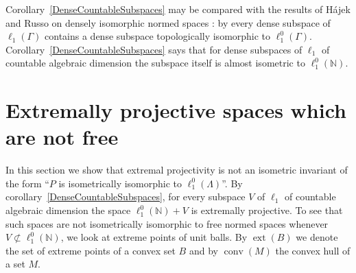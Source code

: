 \documentclass[12pt]{article}
\newcommand{\lo}[1]{\ell_1^0(#1)}
\newcommand{\ellone}[1]{\ell_1(#1)}
\newcommand{\ext}{\operatorname{ext}}
\newcommand{\conv}{\operatorname{conv}}
\begin{document}
Corollary~\ref{DenseCountableSubspaces} may be compared with the results of
H\'ajek and Russo on densely isomorphic normed spaces
\cite{HajekRussoDenselyIsom}: by \cite[theorem 2.4]{HajekRussoDenselyIsom}
every dense subspace of $\ellone{\Gamma}$ contains a dense subspace
topologically isomorphic to $\lo{\Gamma}$. Corollary~\ref{DenseCountableSubspaces}
says that for dense subspaces of $\ell_1$ of countable algebraic dimension
the subspace itself is almost isometric to $\lo{\mathbb{N}}$.


\section{Extremally projective spaces which are not free}\label{SectionCounterexample}

In this section we show that extremal projectivity is not an isometric
invariant of the form ``$P$ is isometrically isomorphic to $\lo{\Lambda}$''.
By corollary~\ref{DenseCountableSubspaces}, for every subspace $V$ of $\ell_1$
of countable algebraic dimension the space $\lo{\mathbb{N}}+V$ is extremally
projective. To see that such spaces are not isometrically isomorphic to free normed
spaces whenever $V\not\subset\lo{\mathbb{N}}$, we look at extreme points of
unit balls. By $\ext(B)$ we denote the set of extreme points of a convex set
$B$ and by $\conv(M)$ the convex hull of a set $M$.
\end{document}
